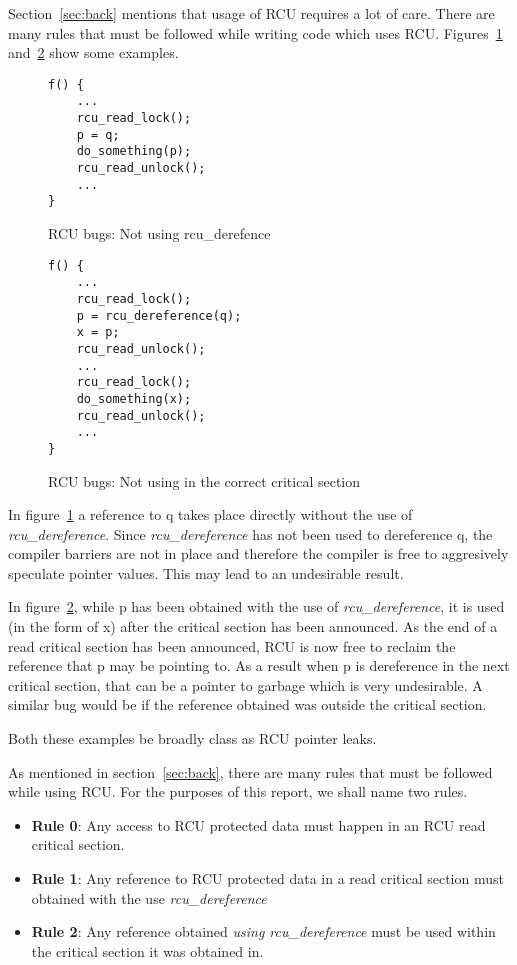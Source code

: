 Section~\ref{sec:back} mentions that usage of RCU requires a lot of care. 
There are many rules that must be followed while writing code
which uses RCU. Figures~\ref{fig:rcuderefbug} and~\ref{fig:rcuusebug} show
some examples.

\begin{figure}[h]
\centering
\begin{lstlisting}
f() {
	...
	rcu_read_lock();
	p = q;
	do_something(p);
	rcu_read_unlock();
	...
}
\end{lstlisting}
\caption{RCU bugs: Not using rcu\_derefence}\label{fig:rcuderefbug}
\end{figure}

\begin{figure}[h]
\centering
\begin{lstlisting}
f() {
	...
	rcu_read_lock();
	p = rcu_dereference(q);
	x = p;
	rcu_read_unlock();
	...
	rcu_read_lock();
	do_something(x);
	rcu_read_unlock();
	...
}
\end{lstlisting}
\caption{RCU bugs: Not using in the correct critical section}\label{fig:rcuusebug}
\end{figure}

In figure~\ref{fig:rcuderefbug} a reference to q takes place directly without the use
of \emph{rcu\_dereference}. Since \emph{rcu\_dereference} has not been used to
dereference q, the compiler barriers are not in place and therefore the compiler
is free to aggresively speculate pointer values. This may lead to an undesirable
result.

In figure~\ref{fig:rcuusebug}, while p has been obtained with the
use of \emph{rcu\_dereference}, it is used (in the form of x) after the critical section
has been announced. As the end of a read critical section has been announced,
RCU is now free to reclaim the reference that p may be pointing to. As a result
when p is dereference in the next critical section, that can be a pointer to
garbage which is very undesirable.  A similar bug would be if the reference
obtained was outside the critical section.

Both these examples be broadly class as RCU pointer leaks.

As mentioned in section~\ref{sec:back}, there are many rules that must be followed
while using RCU. For the purposes of this report, we shall name two rules.
\begin{itemize}
\item{\bf Rule 0}: Any access to RCU protected data must happen in an RCU read critical section.
\item{\bf Rule 1}: Any reference to RCU protected data in a read critical section must obtained with the use \emph{rcu\_dereference}
\item{\bf Rule 2}: Any reference obtained \emph{using rcu\_dereference} must be used within the critical section it was obtained in.
\end{itemize}

